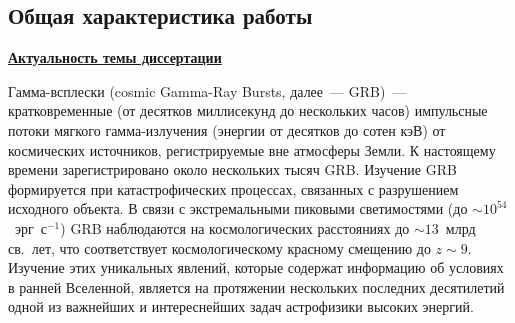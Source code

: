 \subsection*{\Large Общая характеристика работы}
\fontsize{14pt}{15pt}\selectfont
\underline{\textbf{Актуальность темы диссертации}}

Гамма-всплески (cosmic Gamma-Ray Bursts, далее~--- GRB)~--- кратковременные 
(от десятков миллисекунд до нескольких часов) импульсные потоки мягкого гамма-излучения 
(энергии от десятков до сотен кэВ)  
от космических источников, регистрируемые вне атмосферы Земли. К настоящему времени 
зарегистрировано около нескольких тысяч GRB. 
Изучение GRB формируется при катастрофических процессах, связанных с разрушением исходного
объекта. В связи с экстремальными пиковыми светимостями (до $\sim 10^{54}$~эрг~с$^{-1}$)
GRB наблюдаются на космологических расстояниях до $\sim 13$~млрд св.~лет, что соответствует 
космологическому красному смещению до $z\sim9$. Изучение этих уникальных явлений, которые содержат
информацию об условиях в ранней Вселенной, является на протяжении нескольких 
последних десятилетий одной из важнейших и интереснейших задач астрофизики высоких энергий.

